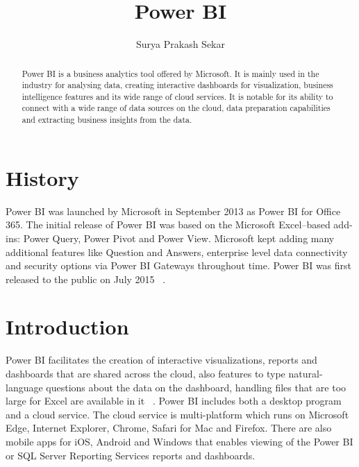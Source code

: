 
\title{Power BI}

\author{Surya Prakash Sekar}

\renewcommand{\shortauthors}{Surya Prakash Sekar}

\begin{abstract}
Power BI is a business analytics tool offered by Microsoft. It is mainly used 
in the industry for analysing data, creating interactive dashboards for 
visualization, business intelligence features and its wide range of cloud 
services. It is notable for its ability to connect with a wide range of data 
sources on the cloud, data preparation capabilities and extracting business 
insights from the data.
\end{abstract}


\maketitle

\section{History}
Power BI was launched by Microsoft in September 2013 as Power BI for 
Office 365. The initial release of Power BI was based on the Microsoft 
Excel–based add-ins: Power Query, Power Pivot and Power View. Microsoft kept 
adding many additional features like Question and Answers, enterprise level 
data connectivity and security options via Power BI Gateways throughout time. 
Power BI was first released to the public on July 2015 
~\cite{hid-sp18-418-power bi-history}.

\section{Introduction}
Power BI facilitates the creation of interactive visualizations, reports and 
dashboards that are shared across the cloud, also features to type 
natural-language questions about the data on the dashboard, handling files 
that are too large for Excel are available in it ~\cite{hid-sp18-418-power bi
-intro}.
Power BI includes both a desktop program and a cloud service. The cloud service 
is multi-platform which runs on Microsoft Edge, Internet Explorer, Chrome, 
Safari for Mac and Firefox. There are also mobile apps for iOS, Android and 
Windows that enables viewing of the Power BI or SQL Server Reporting Services 
reports and dashboards.
